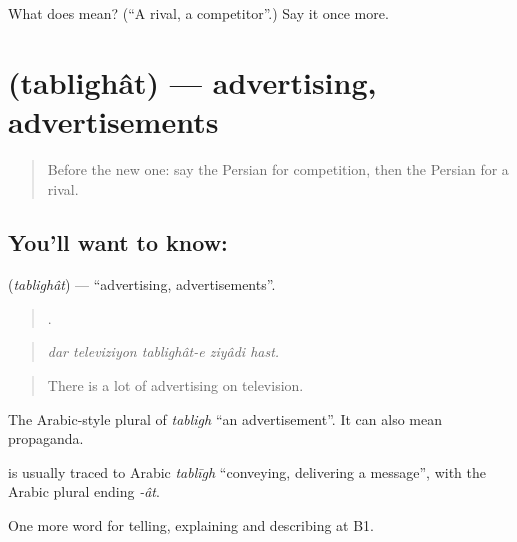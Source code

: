 \begin{tcolorbox}[breakable,colback=teal!4,colframe=teal!35!black,title={Before you move on}]
What does  mean? (\textquotedblleft{}A rival, a competitor\textquotedblright{}.) Say it once more.
\end{tcolorbox}
\section[\texorpdfstring{\fa{تبلیغات} (tablighât)}{تبلیغات (tablighât)}]{ (tablighât) — advertising, advertisements}

\label{lesson:FA-C383-tablighat}



\begin{quote}
Before the new one: say the Persian for competition, then the Persian for a rival.
\end{quote}

\subsection*{You'll want to know: }
\textbf{} (\emph{tablighât}) — \textquotedblleft{}advertising, advertisements\textquotedblright{}.

\begin{quote}
    .
\end{quote}

\begin{quote}
\emph{dar televiziyon tablighât-e ziyâdi hast.}
\end{quote}

\begin{quote}
There is a lot of advertising on television.
\end{quote}

The Arabic-style plural of \emph{tabligh} \textquotedblleft{}an advertisement\textquotedblright{}. It can also mean propaganda.

\begin{cousinweb}
\textbf{} is usually traced to Arabic \emph{tablīgh} \textquotedblleft{}conveying, delivering a message\textquotedblright{}, with the Arabic plural ending \emph{-ât}.
\end{cousinweb}

\begin{grammarlens}[title={What you've built}]
One more word for telling, explaining and describing at B1.
\end{grammarlens}

